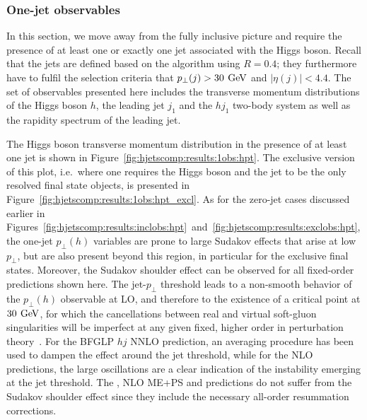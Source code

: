 \subsubsection{One-jet observables}
\label{sec:hjetscomp:results:1jobs}

In this section, we move away from the fully inclusive picture and
require the presence of at least one or exactly one jet associated with 
the Higgs boson. Recall that the jets are defined based on the
\hjetscompantikt algorithm using $R=0.4$; they furthermore have to fulfil the selection
criteria that $p_\perp(j)>30\,\text{\:GeV}$ and $|\eta(j)|<4.4$. The set of
observables presented here includes the transverse momentum
distributions of the Higgs boson $h$, the leading jet $j_1$ and the
$hj_1$ two-body system as well as the rapidity spectrum of the leading
jet.

The Higgs boson transverse momentum distribution in the presence of at
least one jet is shown in
Figure~\ref{fig:hjetscomp:results:1obs:hpt}. The exclusive version of
this plot, i.e.~where one requires the Higgs boson and the jet to be 
the only resolved final state objects,
is presented in Figure~\ref{fig:hjetscomp:results:1obs:hpt_excl}. As
for the zero-jet cases discussed earlier in
Figures~\ref{fig:hjetscomp:results:inclobs:hpt}~and~\ref{fig:hjetscomp:results:exclobs:hpt},
the one-jet $p_\perp(h)$ variables are prone to large Sudakov effects that arise at low $p_\perp$, 
but are also present beyond
this region, in particular for the exclusive final states. Moreover, the
Sudakov shoulder effect can be observed for all fixed-order
predictions shown here. The jet-$p_\perp$ threshold leads to a
non-smooth behavior of the $p_\perp(h)$ observable at LO, and
therefore to the existence of a critical point at $30\,\text{\:GeV}$, for which
the cancellations between real and virtual soft-gluon singularities
will be imperfect at any given fixed, higher order in perturbation
theory~\cite{Catani:1997xc}. For the BFGLP $hj$ NNLO  prediction, an
averaging procedure has been used to dampen the effect around the jet
threshold, while for the NLO predictions, the large oscillations are a
clear indication of the instability emerging at the jet threshold. The
\hjetscompNNLOPS, NLO ME+PS and \hjetscompResbos predictions do not suffer from
the Sudakov shoulder effect since they include the necessary all-order
resummation corrections.

